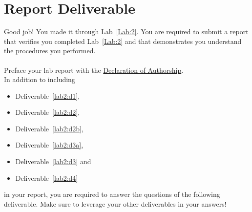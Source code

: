 \section{Report Deliverable}
Good job! You made it through Lab~\ref{Lab:2}.
You are required to submit a report
that verifies you completed Lab~\ref{Lab:2} and that demonstrates you
understand the procedures you performed.\\
\\
Preface your lab report with the \hyperlink{intro:decl}{Declaration of Authorship}.\\

 In addition to including
\begin{itemize}
  \item{Deliverable~\ref{lab2:d1},}
  \item{Deliverable~\ref{lab2:d2},}
  \item{Deliverable~\ref{lab2:d2b},}
  \item{Deliverable~\ref{lab2:d3a},}
  \item{Deliverable~\ref{lab2:d3} and }
  \item{Deliverable~\ref{lab2:d4}}
\end{itemize}
in your report,
you are required to answer the questions of the following deliverable.
Make sure to leverage your other deliverables in your answers!
